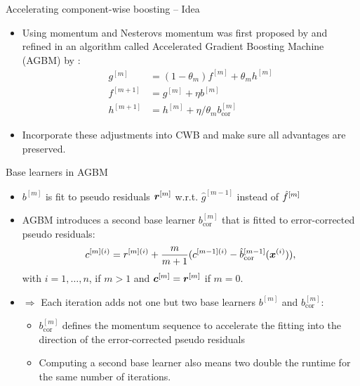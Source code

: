 \documentclass[t,10pt]{beamer}
\begin{document}
\begin{frame}{Accelerating component-wise boosting -- Idea}

  \begin{itemize}
    \item
      Using momentum and Nesterovs momentum was first proposed by \cite{biau2019accelerated} and refined in an algorithm called Accelerated Gradient Boosting Machine (AGBM) by \cite{lu2020accelerating}:
      \begin{align*}
      g^{[m]} &= (1 - \theta_m) f^{[m]} + \theta_m h^{[m]}\\
      f^{[m+1]} &= g^{[m]} + \eta b^{[m]} \\
      h^{[m+1]} &= h^{[m]} + \eta / \theta_m b^{[m]}_{\text{cor}}
      \end{align*}
    \item
      Incorporate these adjustments into CWB and make sure all advantages are preserved.
  \end{itemize}

\end{frame}

\begin{frame}{Base learners in AGBM}
  \begin{itemize}
    \item
      \(b^{[m]}\) is fit to pseudo residuals \(\bm{r}^{[m]}\) w.r.t.
      \(\hat{g}^{[m-1]}\) instead of \(\hat{f}^{[m]}\)

    \item
      AGBM introduces a second base learner $b^{[m]}_{\text{cor}}$ that is fitted to error-corrected pseudo residuals:
      \[c^{[m](i)} = r^{[m](i)} + \frac{m}{m+1}(c^{[m-1](i)} - \hat{b}_{\text{cor}}^{[m-1]}(\bm{x}^{(i)})),\]
      with \(i = 1, \dots, n\), if \(m > 1\) and \(\bm{c}^{[m]} = \bm{r}^{[m]}\) if
      \(m = 0\).

    \item[] $\Rightarrow$ Each iteration adds not one but two base learners $b^{[m]}$ and $b^{[m]}_{\text{cor}}$:
      \begin{itemize}
        \item $b^{[m]}_{\text{cor}}$ defines the momentum sequence to accelerate the fitting into the direction of the error-corrected pseudo residuals
        \item Computing a second base learner also means two double the runtime for the same number of iterations.
      \end{itemize}
  \end{itemize}
\end{frame}
\end{document}
